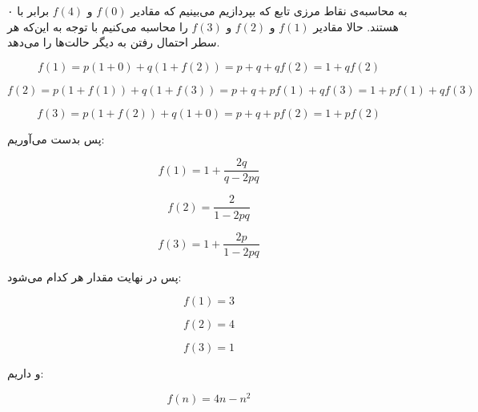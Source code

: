 به محاسبه‌ی نقاط مرزی تابع که بپردازیم می‌بینیم که مقادیر
$f(0)$
و
$f(4)$
برابر با ۰ هستند.
حالا مقادیر
$f(1)$
و
$f(2)$
و
$f(3)$
را محاسبه می‌کنیم با توجه به این‌که هر سطر احتمال رفتن به دیگر حالت‌ها را می‌دهد.

$$
f(1) = p(1 + 0) + q(1 + f(2)) = p + q + qf(2) = 1 + qf(2)
$$

$$
f(2) = p(1 + f(1)) + q(1 + f(3)) = p + q + pf(1) + qf(3) = 1 + pf(1) + qf(3)
$$

$$
f(3) = p(1 + f(2)) + q(1 + 0) = p + q + pf(2) = 1 + pf(2)
$$

پس بدست می‌آوریم:

$$
f(1) = 1 + \frac{2q}{q - 2pq}
$$

$$
f(2) = \frac{2}{1 - 2pq}
$$

$$
f(3) = 1 + \frac{2p}{1 - 2pq}
$$

پس در نهایت مقدار هر کدام می‌شود:

$$
f(1) = 3
$$

$$
f(2) = 4
$$

$$
f(3) = 1
$$

و داریم:

$$
f(n) = 4n - n^2
$$

